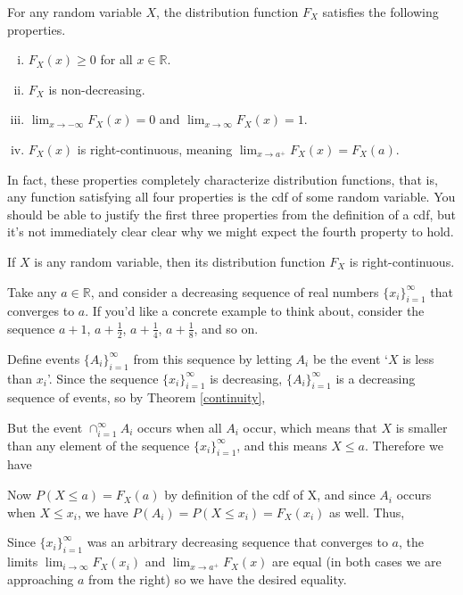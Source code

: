 \begin{prop}\label{cdfproperties}
For any random variable $X$, the distribution function $F_X$ satisfies the following properties.
\vspace{-0.5em}
\begin{enumerate}[(i)]
\item $F_X(x) \geq 0$ for all $x \in \mathbb{R}$.
\item $F_X$ is non-decreasing.
\item $\displaystyle\lim_{x \to -\infty} F_X(x) = 0$ and $\displaystyle\lim_{x \to \infty} F_X(x) = 1$.
\item $F_X(x)$ is right-continuous, meaning $\displaystyle\lim_{x \to a^{+}} F_X(x) = F_X(a)$.
\end{enumerate}
\end{prop}

\par
In fact, these properties completely characterize distribution functions, that is, any function satisfying all four properties is the cdf of some random variable. You should be able to justify the first three properties from the definition of a cdf, but it's not immediately clear clear why we might expect the fourth property to hold.

\begin{thm}
If $X$ is any random variable, then its distribution function $F_X$ is right-continuous.
\end{thm}
\begin{pf}
Take any $a \in \mathbb{R}$, and consider a decreasing sequence of real numbers $\{x_i\}_{i=1}^{\infty}$ that converges to $a$. If you'd like a concrete example to think about, consider the sequence $a+1$, $a+\frac{1}{2}$, $a+\frac{1}{4}$, $a+\frac{1}{8}$, and so on.
\par
\noindent Define events $\{A_i\}_{i=1}^{\infty}$ from this sequence by letting $A_i$ be the event `$X$ is less than $x_i$'. Since the sequence $\{x_i\}_{i=1}^{\infty}$ is decreasing, $\{A_i\}_{i=1}^{\infty}$ is a decreasing sequence of events, so by Theorem \ref{continuity},
\par
\noindent But the event $\cap_{i=1}^{\infty}A_i$ occurs when all $A_i$ occur, which means that $X$ is smaller than any element of the sequence $\{x_i\}_{i=1}^{\infty}$, and this means $X \leq a$. Therefore we have
\par
\noindent Now $P(X \leq a) = F_X(a)$ by definition of the cdf of X, and since $A_i$ occurs when $X \leq x_i$, we have $P(A_i) = P(X \leq x_i) = F_X(x_i)$ as well. Thus,
\par
\noindent Since $\{x_i\}_{i=1}^{\infty}$ was an arbitrary decreasing sequence that converges to $a$, the limits $\lim_{i \to \infty}F_X(x_i)$ and $\lim_{x \to a^+}F_X(x)$ are equal (in both cases we are approaching $a$ from the right) so we have the desired equality.
\end{pf}

